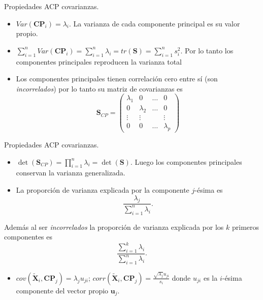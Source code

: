 \documentclass[
  spanish,
  ignorenonframetext,
]{beamer}
\providecommand{\tightlist}{%
  \setlength{\itemsep}{0pt}\setlength{\parskip}{0pt}}
\begin{document}
\begin{frame}{Propiedades ACP covarianzas.}
\protect\hypertarget{propiedades-acp-covarianzas.-2}{}
\begin{itemize}
\tightlist
\item
  \(Var(\mathbf{CP}_i)= \lambda_i\). La varianza de cada componente
  principal es su valor propio.
\item
  \(\sum_{i=1}^n Var(\mathbf{CP}_i)=\sum_{i=1}^n \lambda_i=tr(\mathbf{S})=\sum_{i=1}^n s_i^2\).
  Por lo tanto los componentes principales reproducen la varianza total
\item
  Los componentes principales tienen correlación cero entre sí (son
  \emph{incorrelados}) por lo tanto su matriz de covarianzas es
  \[\mathbf{S}_{CP}=\left(\begin{array}{cccc}
  \lambda_1& 0 &\ldots &  0\\
  0& \lambda_{2}&\ldots & 0\\
  \vdots & \vdots & & \vdots\\
  0 & 0&\ldots &  \lambda_{p}
  \end{array}
  \right)\]
\end{itemize}
\end{frame}

\begin{frame}{Propiedades ACP covarianzas.}
\protect\hypertarget{propiedades-acp-covarianzas.-3}{}
\begin{itemize}
\item
  \(\det(\mathbf{S}_{CP})=\prod_{i=1}^n \lambda_i =\det(\mathbf{S})\).
  Luego los componentes principales conservan la varianza generalizada.
\item
  La proporción de varianza explicada por la componente \(j\)-ésima es
  \[\frac{\lambda_j}{\sum_{i=1}^n \lambda_i}.\]
\end{itemize}

Además al ser \emph{incorrelados} la proporción de varianza explicada
por los \(k\) primeros componentes es \[\frac{\sum_{i=1}^k
\lambda_i}{\sum_{i=1}^n \lambda_i}.\]

\begin{itemize}
\tightlist
\item
  \(cov(\tilde{\mathbf{X}}_i, \mathbf{CP}_j)=\lambda_j u_{j i}\);
  \(corr(\tilde{\mathbf{X}}_i, \mathbf{CP}_j)=\frac{\sqrt{\lambda_j} u_{j i}}{s_i}\)
  donde \(u_{j i}\) es la \(i\)-ésima componente del vector propio
  \(\mathbf{u}_j\).
\end{itemize}
\end{frame}
\end{document}
